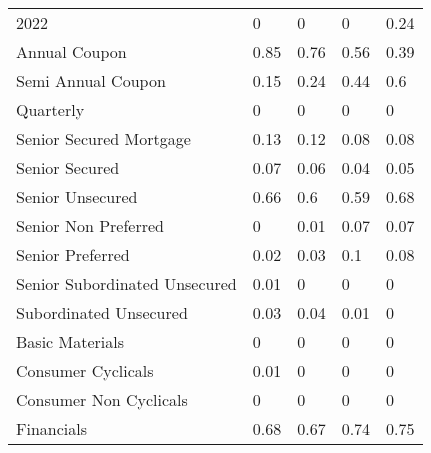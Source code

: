 \begin{table}[H]
\begin{tabular}{lllll}
2022 & \cellcolor[HTML]{FCFCFF}0 & \cellcolor[HTML]{FCFCFF}0 & \cellcolor[HTML]{FCFCFF}0 & \cellcolor[HTML]{D1EBDA}0.24 \\
Annual Coupon & \cellcolor[HTML]{63BE7B}0.85 & \cellcolor[HTML]{74C589}0.76 & \cellcolor[HTML]{98D4A9}0.56 & \cellcolor[HTML]{B6E0C3}0.39 \\
Semi Annual   Coupon & \cellcolor[HTML]{E1F2E8}0.15 & \cellcolor[HTML]{D1EBDA}0.24 & \cellcolor[HTML]{ADDCBB}0.44 & \cellcolor[HTML]{90D1A2}0.6 \\
Quarterly & \cellcolor[HTML]{FCFCFF}0 & \cellcolor[HTML]{FCFCFF}0 & \cellcolor[HTML]{FCFCFF}0 & \cellcolor[HTML]{FCFCFF}0 \\
Senior   Secured Mortgage & \cellcolor[HTML]{E5F3EB}0.13 & \cellcolor[HTML]{E7F4ED}0.12 & \cellcolor[HTML]{EEF7F3}0.08 & \cellcolor[HTML]{EEF7F3}0.08 \\
Senior Secured & \cellcolor[HTML]{F0F7F5}0.07 & \cellcolor[HTML]{F2F8F6}0.06 & \cellcolor[HTML]{F5FAF9}0.04 & \cellcolor[HTML]{F3F9F8}0.05 \\
Senior Unsecured & \cellcolor[HTML]{86CC99}0.66 & \cellcolor[HTML]{90D1A2}0.6 & \cellcolor[HTML]{92D1A4}0.59 & \cellcolor[HTML]{82CB96}0.68 \\
Senior Non   Preferred & \cellcolor[HTML]{FCFCFF}0 & \cellcolor[HTML]{FBFCFE}0.01 & \cellcolor[HTML]{F0F7F5}0.07 & \cellcolor[HTML]{F0F7F5}0.07 \\
Senior Preferred & \cellcolor[HTML]{F9FBFC}0.02 & \cellcolor[HTML]{F7FAFB}0.03 & \cellcolor[HTML]{EAF5F0}0.1 & \cellcolor[HTML]{EEF7F3}0.08 \\
Senior   Subordinated Unsecured & \cellcolor[HTML]{FBFCFE}0.01 & \cellcolor[HTML]{FCFCFF}0 & \cellcolor[HTML]{FCFCFF}0 & \cellcolor[HTML]{FCFCFF}0 \\
Subordinated   Unsecured & \cellcolor[HTML]{F7FAFB}0.03 & \cellcolor[HTML]{F5FAF9}0.04 & \cellcolor[HTML]{FBFCFE}0.01 & \cellcolor[HTML]{FCFCFF}0 \\
Basic Materials & \cellcolor[HTML]{FCFCFF}0 & \cellcolor[HTML]{FCFCFF}0 & \cellcolor[HTML]{FCFCFF}0 & \cellcolor[HTML]{FCFCFF}0 \\
Consumer   Cyclicals & \cellcolor[HTML]{FBFCFE}0.01 & \cellcolor[HTML]{FCFCFF}0 & \cellcolor[HTML]{FCFCFF}0 & \cellcolor[HTML]{FCFCFF}0 \\
Consumer   Non Cyclicals & \cellcolor[HTML]{FCFCFF}0 & \cellcolor[HTML]{FCFCFF}0 & \cellcolor[HTML]{FCFCFF}0 & \cellcolor[HTML]{FCFCFF}0 \\
Financials & \cellcolor[HTML]{82CB96}0.68 & \cellcolor[HTML]{84CC97}0.67 & \cellcolor[HTML]{77C78D}0.74 & \cellcolor[HTML]{75C68B}0.75 \\

\end{tabular}
\end{table}

